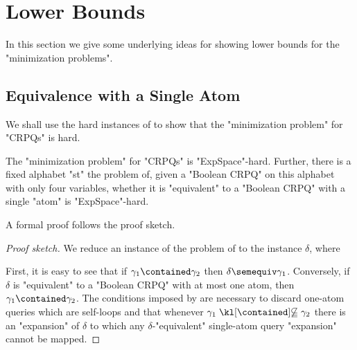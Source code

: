 \section{Lower Bounds}
\label{sec:minimization-lowerbounds}

In this section we give some underlying ideas for showing lower bounds for the "minimization problems". 

\subsection{Equivalence with a Single Atom}

We shall use the hard instances of 
to show that the "minimization problem" for "CRPQs" is hard.
\begin{theorem}
	\AP\label{thm:minimization-lowerbound}
	The "minimization problem" for "CRPQs" is "ExpSpace"-hard.
	Further, there is a fixed alphabet "st" the problem of, given a "Boolean CRPQ"
	on this alphabet with only four variables, whether it is "equivalent"
	to a "Boolean CRPQ" with a single "atom" is "ExpSpace"-hard.
\end{theorem}

A formal proof follows the proof sketch.
\begin{proof}[Proof sketch]
	We reduce an instance of the problem of  to the instance
	$\delta$, where
	\begin{center}
    \end{center}
	First, it is easy to see that if $\gamma_1 \contained \gamma_2$ then $\delta \semequiv \gamma_1$. Conversely, if $\delta$ is "equivalent" to a "Boolean CRPQ" with at most one atom, then $\gamma_1 \contained \gamma_2$.
	The conditions imposed by  are necessary to discard one-atom queries which are self-loops and that whenever  $\gamma_1 \notcontained \gamma_2$ there is an "expansion" of $\delta$ to which any $\delta$-"equivalent" single-atom query "expansion" cannot be mapped.
\end{proof}


